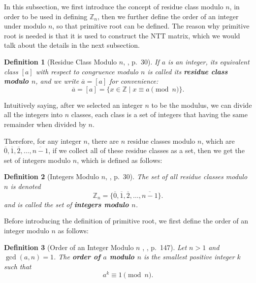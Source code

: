 \documentclass[12pt]{article}
\newtheorem{definition}{Definition}[section]
\begin{document}
In this subsection, we first introduce the concept of residue class modulo $n$, 
in order to be used in defining $\mathbb{Z}_n$, 
then we further define the order of an integer under modulo $n$, 
so that primitive root can be defined. 
The reason why primitive root is needed is that it is used to construct the NTT matrix, 
which we would talk about the details in the next subsection.

\begin{definition}[Residue Class Modulo $n$, \cite{algebra}, p.~30]
    If $a$ is an integer, its equivalent class $[a]$ with respect to congruence modulo $n$ is called its \textbf{residue class modulo $n$}, 
    and we write $\overline{a} = [a]$ for convenience: 
    \begin{equation*}
    \overline{a} = [a] = \{x \in \mathbb{Z} \mid x \equiv a \pmod{n}\}.
    \end{equation*}
\end{definition}

Intuitively saying, after we selected an integer $n$ to be the modulus, 
we can divide all the integers into $n$ classes, 
each class is a set of integers that having the same remainder when divided by $n$.

Therefore, for any integer $n$, there are $n$ residue classes modulo $n$, 
which are $\overline{0}, \overline{1}, \overline{2}, \ldots, \overline{n - 1}$, 
if we collect all of these residue classes as a set, 
then we get the set of integers modulo $n$, 
which is defined as follows:

\begin{definition}[Integers Modulo $n$, \cite{algebra}, p.~30]
    The set of all residue classes modulo $n$ is denoted 
    \begin{equation*}
    \mathbb{Z}_n = \{\overline{0}, \overline{1}, \overline{2}, \ldots, \overline{n - 1}\}.
    \end{equation*}
    and is called the set of \textbf{integers modulo $n$}.
\end{definition}

Before introducing the definition of primitive root, 
we first define the order of an integer modulo $n$ as follows:

\begin{definition}[Order of an Integer Modulo $n$ , \cite{number_theory}, p.~147]
    Let $n > 1$ and $\gcd(a, n) = 1$. 
    The \textbf{order of $a$ modulo $n$} is the smallest positive integer $k$ such that
    \begin{equation*}
    a^k \equiv 1 \pmod{n}.
    \end{equation*}
\end{definition}
\end{document}
